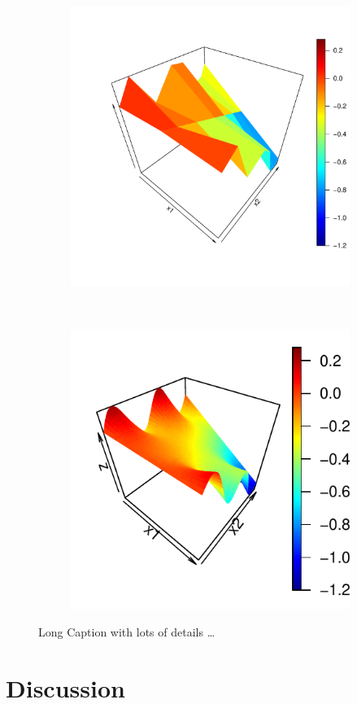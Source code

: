 \begin{figure}
\centering
  \begin{subfigure}[t]{0.48\linewidth}
  \includegraphics[width=\linewidth]{figures/c}
  \caption{\label{fig:graphic_c}}
  \end{subfigure}
  ~
  \begin{subfigure}[t]{0.48\linewidth}
  \includegraphics[width=\linewidth]{figures/d}
  \caption{\label{fig:graphic_d}}
  \end{subfigure}
  \caption[Another short caption for List of Figures]{Long Caption with lots of details
  \ldots \label{fig:chap3_graphic}}
\end{figure}

\section{Discussion}
\lipsum


